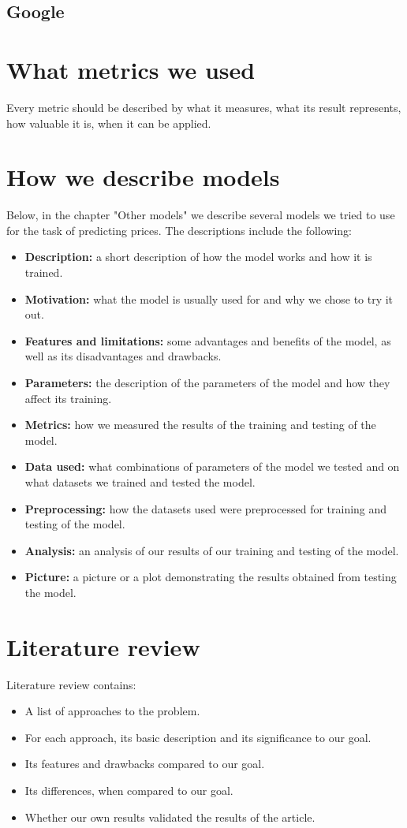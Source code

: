 \subsection{Google}
\section{What metrics we used}
Every metric should be described by what it measures, what its result represents, how valuable it is, when it can be applied.
\section{How we describe models}
Below, in the chapter "Other models" we describe several models we tried to use for the task of predicting prices. The descriptions include the following:
\begin{itemize}
	\item \textbf{Description:} a short description of how the model works and how it is trained.
	\item \textbf{Motivation:} what the model is usually used for and why we chose to try it out.
	\item \textbf{Features and limitations:} some advantages and benefits of the model, as well as its disadvantages and drawbacks.
	\item \textbf{Parameters:} the description of the parameters of the model and how they affect its training.
	\item \textbf{Metrics:} how we measured the results of the training and testing of the model.
	\item \textbf{Data used:} what combinations of parameters of the model we tested and on what datasets we trained and tested the model.
	\item \textbf{Preprocessing:} how the datasets used were preprocessed for training and testing of the model.
	\item \textbf{Analysis:} an analysis of our results of our training and testing of the model.
	\item \textbf{Picture:} a picture or a plot demonstrating the results obtained from testing the model.
\end{itemize}

\section{Literature review}
Literature review contains:
\begin{itemize}
	\item A list of approaches to the problem.
	\item For each approach, its basic description and its significance to our goal.
	\item Its features and drawbacks compared to our goal.
	\item Its differences, when compared to our goal.
	\item Whether our own results validated the results of the article.
\end{itemize}

